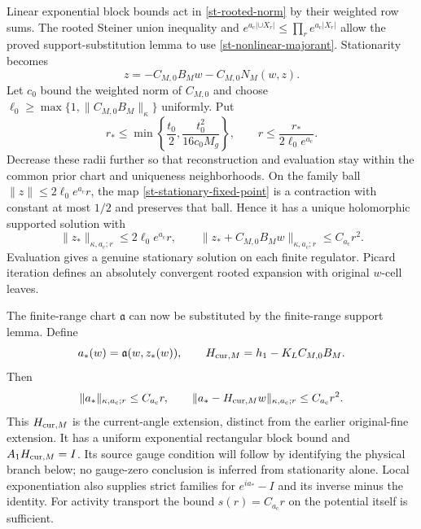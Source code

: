 \documentclass[11pt]{article}
\theoremstyle{remark}
\begin{document}
Linear exponential block bounds act in \eqref{st-rooted-norm} by their
weighted row sums. The rooted Steiner union inequality and
$e^{a_{\mathrm c}|\cup X_r|}\le\prod_r e^{a_{\mathrm c}|X_r|}$ allow the
proved support-substitution lemma to use
\eqref{st-nonlinear-majorant}. Stationarity becomes
\begin{equation}
 z=-C_{M,0}B_Mw-C_{M,0}N_M(w,z).                            \label{st-stationary-fixed-point}
\end{equation}
Let $c_0$ bound the weighted norm of $C_{M,0}$ and choose
$\ell_0\ge\max\{1,\|C_{M,0}B_M\|_\kappa\}$ uniformly. Put
\begin{equation}
 r_*\le\min\left\{\frac{t_0}{2},
                  \frac{t_0^2}{16c_0M_g}\right\},\qquad
 r\le\frac{r_*}{2\ell_0e^{a_{\mathrm c}}}.                     \label{st-data-radius}
\end{equation}
Decrease these radii further so that reconstruction and evaluation stay
within the common prior chart and uniqueness neighborhoods. On the
family ball $\|z\|\le2\ell_0e^{a_{\mathrm c}}r$, the map
\eqref{st-stationary-fixed-point} is a contraction with constant at most
$1/2$ and preserves that ball. Hence it has a unique holomorphic
supported solution with
\begin{equation}
 \|z_*\|_{\kappa,a_{\mathrm c};r}\le2\ell_0e^{a_{\mathrm c}}r,
 \qquad
 \|z_*+C_{M,0}B_Mw\|_{\kappa,a_{\mathrm c};r}\le C_{a_{\mathrm c}}r^2.
                                                               \label{st-retained-support}
\end{equation}
Evaluation gives a genuine stationary solution on each finite
regulator. Picard iteration defines an absolutely convergent rooted
expansion with original $w$-cell leaves.

The finite-range chart $\mathfrak a$ can now be substituted by the
finite-range support lemma. Define
\begin{equation}
 a_*(w)=\mathfrak a(w,z_*(w)),\qquad
 H_{{\rm cur},M}=h_1-K_LC_{M,0}B_M.                          \label{st-current-extension}
\end{equation}
Then
\begin{equation}
 \|a_*\|_{\kappa,a_{\mathrm c};r}\le C_{a_{\mathrm c}}r,
 \qquad
 \|a_*-H_{{\rm cur},M}w\|_{\kappa,a_{\mathrm c};r}
                                      \le C_{a_{\mathrm c}}r^2.          \label{st-current-support}
\end{equation}
This $H_{{\rm cur},M}$ is the current-angle extension, distinct from the
earlier original-fine extension. It has a uniform exponential
rectangular block bound and $A_1H_{{\rm cur},M}=I$. Its source gauge
condition will follow by identifying the physical branch below; no
gauge-zero conclusion is inferred from stationarity alone. Local
exponentiation also supplies strict families for $e^{ia_*}-I$ and its
inverse minus the identity. For activity transport the bound
$s(r)=C_{a_{\mathrm c}}r$ on the potential itself is sufficient.
\end{document}
